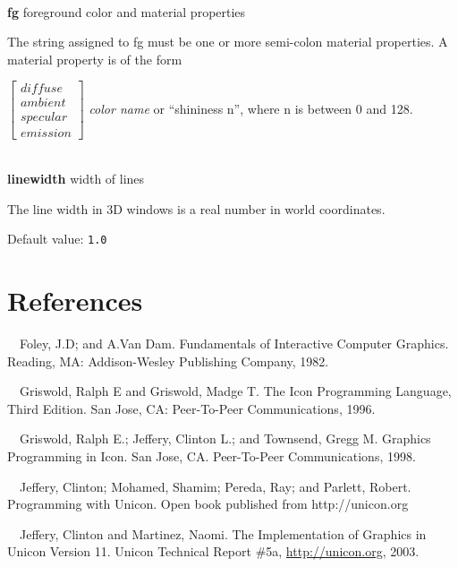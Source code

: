 \documentclass[letterpaper]{article}
\begin{document}
\bigskip

\noindent\hrulefill\\
\noindent\textsf{\textbf{fg}} \hfill foreground color and material properties


\bigskip

The string assigned to fg must be one or more semi-colon
material properties. A material property is of the form

$\left[
\begin{array}{l}
diffuse\\ambient\\specular\\emission
\end{array}
\right]$ \textsf{\textit{color name}} or \textsf{``shininess n''},
where \textsf{n} is between \textsf{0} and \textsf{128}.


\noindent\hrulefill\\
\noindent\textsf{\textbf{linewidth}} \hfill width of lines

\bigskip

\noindent
The line width in 3D windows is a real number in world coordinates.

\bigskip

\noindent
Default value: \texttt{1.0}


\section[References]{References}


\noindent
[Foley82]\ \ Foley, J.D; and A.Van Dam.
Fundamentals of Interactive Computer Graphics. Reading, MA: Addison-Wesley
Publishing Company, 1982.


\bigskip

\noindent
[Griswold96] \ \ Griswold, Ralph E and Griswold, Madge T.
The Icon Programming Language, Third Edition. San Jose, CA:
Peer-To-Peer Communications, 1996.

\bigskip

\noindent
[Griswold98]\ \ Griswold, Ralph E.; Jeffery, Clinton L.; and Townsend, Gregg M.
Graphics Programming in Icon. San Jose, CA.
Peer-To-Peer Communications, 1998.

\bigskip

\noindent
[Jeffery03]\ \ Jeffery, Clinton; Mohamed, Shamim; Pereda, Ray; and
Parlett, Robert. Programming with Unicon. Open book published from
http://unicon.org


\bigskip

\noindent
[JeffMart03]\ \ Jeffery, Clinton and Martinez, Naomi.
The Implementation of Graphics in Unicon Version 11. Unicon
Technical Report \#5a, \href{http://unicon.org/}{http://unicon.org}, 2003.
\end{document}
